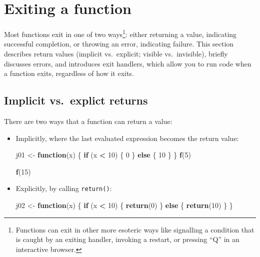 \documentclass[]{book}
\newenvironment{Shaded}{\begin{snugshade}}{\end{snugshade}}
\newcommand{\KeywordTok}[1]{\textcolor[rgb]{0.13,0.29,0.53}{\textbf{#1}}}
\newcommand{\DecValTok}[1]{\textcolor[rgb]{0.00,0.00,0.81}{#1}}
\newcommand{\StringTok}[1]{\textcolor[rgb]{0.31,0.60,0.02}{#1}}
\newcommand{\ControlFlowTok}[1]{\textcolor[rgb]{0.13,0.29,0.53}{\textbf{#1}}}
\newcommand{\OperatorTok}[1]{\textcolor[rgb]{0.81,0.36,0.00}{\textbf{#1}}}
\newcommand{\NormalTok}[1]{#1}
\let\rmarkdownfootnote\footnote%
\def\footnote{\protect\rmarkdownfootnote}
\theoremstyle{definition}
\theoremstyle{definition}
\theoremstyle{definition}
\theoremstyle{remark}
\begin{document}
\section{Exiting a function}\label{exiting-a-function}

Most functions exit in one of two ways\footnote{Functions can exit in
  other more esoteric ways like signalling a condition that is caught by
  an exiting handler, invoking a restart, or pressing ``Q'' in an
  interactive browser.}: either returning a value, indicating successful
completion, or throwing an error, indicating failure. This section
describes return values (implicit vs.~explicit; visible vs.~invisible),
briefly discusses errors, and introduces exit handlers, which allow you
to run code when a function exits, regardless of how it exits.

\subsection{Implicit vs.~explict
returns}\label{implicit-vs.explict-returns}

There are two ways that a function can return a value:

\begin{itemize}
\item
  Implicitly, where the last evaluated expression becomes the return
  value:

\begin{Shaded}
\begin{Highlighting}[]
\NormalTok{j01 <-}\StringTok{ }\ControlFlowTok{function}\NormalTok{(x) \{}
  \ControlFlowTok{if}\NormalTok{ (x }\OperatorTok{<}\StringTok{ }\DecValTok{10}\NormalTok{) \{}
    \DecValTok{0}
\NormalTok{  \} }\ControlFlowTok{else}\NormalTok{ \{}
    \DecValTok{10}
\NormalTok{  \}}
\NormalTok{\}}
\KeywordTok{f}\NormalTok{(}\DecValTok{5}\NormalTok{)}
\end{Highlighting}
\end{Shaded}

\begin{Shaded}
\begin{Highlighting}[]
\KeywordTok{f}\NormalTok{(}\DecValTok{15}\NormalTok{)}
\end{Highlighting}
\end{Shaded}
\item
  Explicitly, by calling \texttt{return()}:

\begin{Shaded}
\begin{Highlighting}[]
\NormalTok{j02 <-}\StringTok{ }\ControlFlowTok{function}\NormalTok{(x) \{}
  \ControlFlowTok{if}\NormalTok{ (x }\OperatorTok{<}\StringTok{ }\DecValTok{10}\NormalTok{) \{}
    \KeywordTok{return}\NormalTok{(}\DecValTok{0}\NormalTok{)}
\NormalTok{  \} }\ControlFlowTok{else}\NormalTok{ \{}
    \KeywordTok{return}\NormalTok{(}\DecValTok{10}\NormalTok{)}
\NormalTok{  \}}
\NormalTok{\}}
\end{Highlighting}
\end{Shaded}
\end{itemize}
\end{document}
